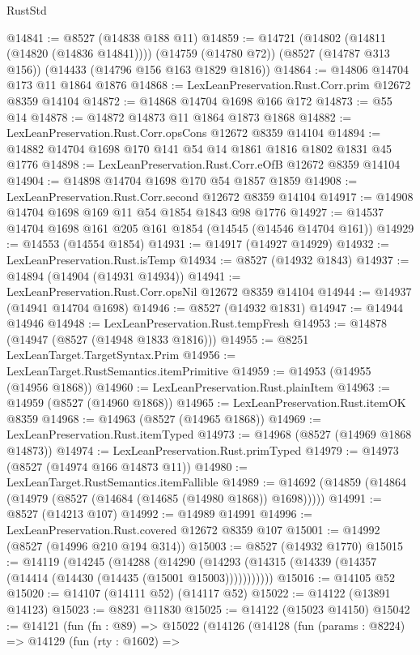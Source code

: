 \begin{lexlean}{RustStd}
\begin{coremodule}
@14841 := @8527 (@14838 @188 @11)
@14859 := @14721
    (@14802 (@14811 (@14820 (@14836 @14841))))
    (@14759 (@14780 @72))
    (@8527 (@14787 @313 @156))
    (@14433 (@14796 @156 @163 @1829 @1816))
@14864 := @14806 @14704 @173 @11 @1864 @1876
@14868 := LexLeanPreservation.Rust.Corr.prim @12672 @8359 @14104
@14872 := @14868 @14704 @1698 @166 @172
@14873 := @55 @14
@14878 := @14872 @14873 @11 @1864 @1873 @1868
@14882 := LexLeanPreservation.Rust.Corr.opsCons @12672 @8359 @14104
@14894 := @14882 @14704 @1698 @170 @141 @54 @14 @1861 @1816 @1802 @1831 @45 @1776
@14898 := LexLeanPreservation.Rust.Corr.eOfB @12672 @8359 @14104
@14904 := @14898 @14704 @1698 @170 @54 @1857 @1859
@14908 := LexLeanPreservation.Rust.Corr.second @12672 @8359 @14104
@14917 := @14908 @14704 @1698 @169 @11 @54 @1854 @1843 @98 @1776
@14927 := @14537 @14704 @1698 @161 @205 @161 @1854 (@14545 (@14546 @14704 @161))
@14929 := @14553 (@14554 @1854)
@14931 := @14917 (@14927 @14929)
@14932 := LexLeanPreservation.Rust.isTemp
@14934 := @8527 (@14932 @1843)
@14937 := @14894 (@14904 (@14931 @14934))
@14941 := LexLeanPreservation.Rust.Corr.opsNil @12672 @8359 @14104
@14944 := @14937 (@14941 @14704 @1698)
@14946 := @8527 (@14932 @1831)
@14947 := @14944 @14946
@14948 := LexLeanPreservation.Rust.tempFresh
@14953 := @14878 (@14947 (@8527 (@14948 @1833 @1816)))
@14955 := @8251 LexLeanTarget.TargetSyntax.Prim
@14956 := LexLeanTarget.RustSemantics.itemPrimitive
@14959 := @14953 (@14955 (@14956 @1868))
@14960 := LexLeanPreservation.Rust.plainItem
@14963 := @14959 (@8527 (@14960 @1868))
@14965 := LexLeanPreservation.Rust.itemOK @8359
@14968 := @14963 (@8527 (@14965 @1868))
@14969 := LexLeanPreservation.Rust.itemTyped
@14973 := @14968 (@8527 (@14969 @1868 @14873))
@14974 := LexLeanPreservation.Rust.primTyped
@14979 := @14973 (@8527 (@14974 @166 @14873 @11))
@14980 := LexLeanTarget.RustSemantics.itemFallible
@14989 := @14692 (@14859 (@14864 (@14979 (@8527 (@14684 (@14685 (@14980 @1868)) @1698)))))
@14991 := @8527 (@14213 @107)
@14992 := @14989 @14991
@14996 := LexLeanPreservation.Rust.covered @12672 @8359 @107
@15001 := @14992 (@8527 (@14996 @210 @194 @314))
@15003 := @8527 (@14932 @1770)
@15015 := @14119
    (@14245
      (@14288
        (@14290 (@14293 (@14315 (@14339 (@14357 (@14414 (@14430 (@14435 (@15001 @15003)))))))))))
@15016 := @14105 @52
@15020 := @14107 (@14111 @52) (@14117 @52)
@15022 := @14122 (@13891 @14123)
@15023 := @8231 @11830
@15025 := @14122 (@15023 @14150)
@15042 := @14121
    (fun (fn : @89) =>
    @15022
      (@14126
        (@14128
          (fun (params : @8224) =>
          @14129
            (fun (rty : @1602) =>

\end{coremodule}
\end{lexlean}
